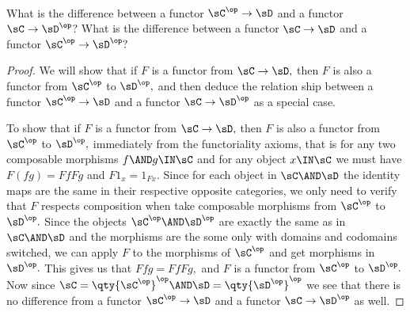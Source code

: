 \documentclass[main.tex]{subfiles}
\begin{document}
\paragraph{}
\begin{exercise}
	What is the difference between a functor
	$ \sC^{\op}\to \sD $ and a functor $ \sC\to \sD^{\op} $? What is the
	difference between a functor  $ \sC \to \sD $ and a functor $ \sC^{\op}\to \sD^{\op}?$
\end{exercise}

\begin{proof}
	We will show that if $ F $ is a functor from $ \sC\to\sD,$ then $ F $ is
	also a functor from $ \sC^\op $ to $ \sD^\op,$ and then deduce the relation
	ship between a functor $ \sC^{\op}\to \sD $ and a functor $ \sC\to
	\sD^{\op}$ as a special case.

	To show that if $ F $ is a functor from $ \sC\to\sD,$ then $ F $ is
	also a functor from $ \sC^\op $ to $ \sD^\op,$
	immediately from the functoriality axioms, that is for any two composable
	morphisms $ f\AND g \IN\sC $ and for any object $ x\IN\sC $ we must have
	$F(fg)=FfFg$ and $ F1_x=1_{Fx}.$ Since for each object in $ \sC\AND \sD $
	the identity maps are the same in their respective opposite categories, we
	only need to verify that $ F $ respects composition when take composable
	morphisms from $\sC^\op $ to $ \sD^\op.$ Since the objects  $ \sC^\op
	\AND\sD^\op$ are exactly the same as in $ \sC\AND \sD$ and the morphisms
	are the some only with domains and codomains switched, we can apply $ F $
	to the morphisms of $ \sC^\op $ and get morphisms in $ \sD^\op.$ This gives
	us that	$ Ffg=FfFg, $ and $ F $ is a functor from $ \sC^\op  $ to $
	\sD^\op. $ Now since $ \sC=\qty{\sC^\op}^\op \AND \sD=\qty{\sD^\op}^\op$ we
	see that there is no difference from a functor $ \sC^{\op} \to \sD $ and a
	functor $ \sC\to \sD^{\op}  $ as well.
\end{proof}
\end{document}
